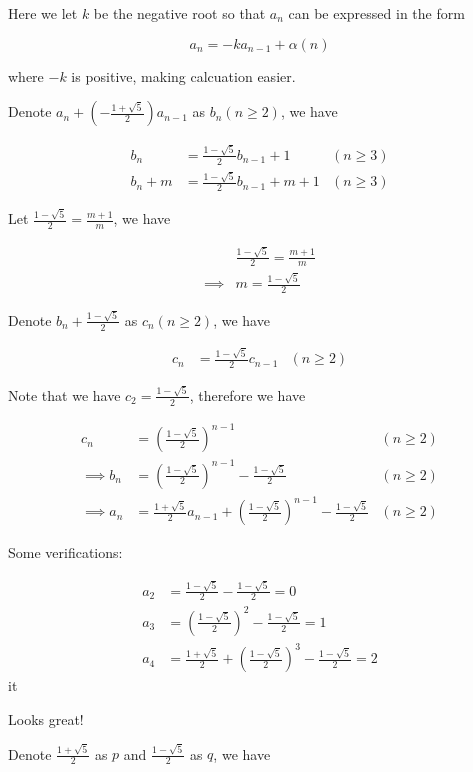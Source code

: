 \documentclass[../main.tex]{subfiles}
\begin{document}
Here we let $k$ be the negative root so that $a_n$ can be expressed in the form

$$
a_n = -ka_{n-1} + \alpha(n)
$$

where $-k$ is positive, making calcuation easier.

Denote $a_n + (-\frac{1+\sqrt{5}}{2})a_{n-1}$ as $b_n (n \ge 2)$, we have

\begin{align*}
b_n &= \frac{1-\sqrt{5}}{2} b_{n-1} + 1 & (n \ge 3)\\
b_n + m &= \frac{1-\sqrt{5}}{2} b_{n-1} + m + 1 & (n \ge 3)
\end{align*}

Let $\frac{1-\sqrt{5}}{2} = \frac{m+1}{m}$, we have

\begin{align*}
& \frac{1-\sqrt{5}}{2} = \frac{m+1}{m}\\
\implies & m = \frac{1-\sqrt{5}}{2}
\end{align*}

Denote $b_n + \frac{1-\sqrt{5}}{2}$ as $c_n (n \ge 2)$, we have

\begin{align*}
c_n &= \frac{1-\sqrt{5}}{2}c_{n-1} & (n \ge 2)
\end{align*}

Note that we have $c_2 = \frac{1-\sqrt{5}}{2}$, therefore we have

\begin{align*}
 c_n &= \left (\frac{1-\sqrt{5}}{2}\right )^{n-1} & (n \ge 2)\\
\implies b_n &= \left (\frac{1-\sqrt{5}}{2}\right )^{n-1} - \frac{1-\sqrt{5}}{2} & (n \ge 2)\\
\implies a_n &= \frac{1+\sqrt{5}}{2}a_{n-1} + \left (\frac{1-\sqrt{5}}{2}\right )^{n-1} - \frac{1-\sqrt{5}}{2} & (n \ge 2)
\end{align*}

Some verifications:

\begin{align*}
a_2 &= \frac{1-\sqrt{5}}{2} - \frac{1-\sqrt{5}}{2} = 0\\
a_3 &= \left (\frac{1-\sqrt{5}}{2}\right )^2 - \frac{1-\sqrt{5}}{2} = 1\\
a_4 &= \frac{1+\sqrt{5}}{2} + \left (\frac{1-\sqrt{5}}{2}\right )^{3} - \frac{1-\sqrt{5}}{2} = 2
\end{align*}it

Looks great!

Denote $\frac{1+\sqrt{5}}{2}$ as $p$ and $\frac{1-\sqrt{5}}{2}$ as $q$, we have
\end{document}
